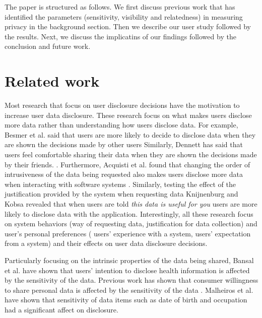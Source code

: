 \documentclass[10pt]{article}
\begin{document}
The paper is structured as follows. We first discuss previous work that has identified the parameters (sensitivity, visibility and relatedness) in measuring privacy in the background section. Then we describe our user study followed by the results. Next, we discuss the implicatins of our findings followed by the conclusion and future work.

\section {Related work}

Most research that focus on user disclosure decisions have the motivation to increase user data disclosure. These research focus on what makes users disclose more data rather than understanding how users disclose data. For example, Besmer et al. said that users are more likely to decide to disclose data when they are shown the decisions made by other users \cite {besmer2010impact} Similarly, Dennett has said that users feel comfortable sharing their data when they are shown the decisions made by their friends. \cite {dennett2000little}. Furthermore, Acquisti et al. found that changing the order of intrusiveness of the data being requested also makes users disclose more data when interacting with software systems \cite {acquisti2012impact}. Similarly, testing the effect of the justification provided by the system when requesting data Knijnenburg and Kobsa \cite {knijnenburg2013helping} revealed that when users are told \textit{this data is useful for you} users are more likely to disclose data with the application. Interestingly, all these research focus on system behaviors (way of requesting data, justification for data collection) and user's personal preferences ( users' experience with a system, users' expectation from a system) and their effects on user data disclosure decisions.

Particularly focusing on the intrinsic properties of the data being shared, Bansal et al. have shown that users' intention to disclose health information is affected by the sensitivity of the data\cite {bansal2010impact}. Previous work has shown that consumer willingness to share personal data is affected by the sensitivity of the data \cite {malhotra2004internet}. Malheiros et al. \cite {malheiros2013fairly} have shown that sensitivity of data items such as date of birth and occupation had a significant affect on disclosure. 
\end{document}
